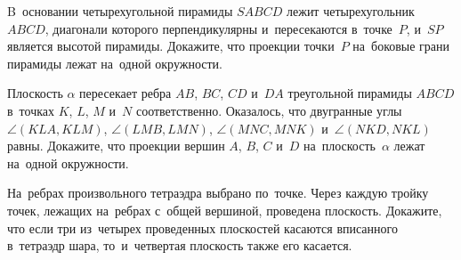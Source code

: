 \begin{problems}
\item
B~основании четырехугольной пирамиды $SABCD$ лежит четырехугольник $ABCD$,
диагонали которого перпендикулярны и~пересекаются в~точке~$P$, и~$SP$ является
высотой пирамиды.
Докажите, что проекции точки~$P$ на~боковые грани пирамиды лежат на~одной
окружности.

\item
Плоскость $\alpha$ пересекает ребра $AB$, $BC$, $CD$ и~$DA$ треугольной
пирамиды $ABCD$ в~точках $K$, $L$, $M$ и~$N$ соответственно.
Оказалось, что двугранные углы
$\angle{(KLA, KLM)}$, $\angle{(LMB, LMN)}$, $\angle{(MNC, MNK)}$
и~$\angle{(NKD, NKL)}$ равны.
Докажите, что проекции вершин $A$, $B$, $C$ и~$D$ на~плоскость~$\alpha$ лежат
на~одной окружности.

\item
На~ребрах произвольного тетраэдра выбрано по~точке.
Через каждую тройку точек, лежащих на~ребрах с~общей вершиной, проведена
плоскость.
Докажите, что если три из~четырех проведенных плоскостей касаются вписанного
в~тетраэдр шара, то~и~четвертая плоскость также его касается.

\end{problems}

